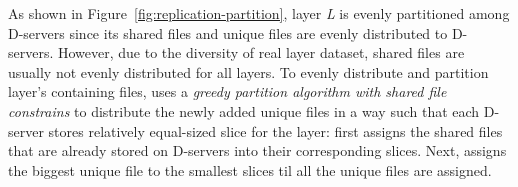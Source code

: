 As shown in Figure~\ref{fig:replication-partition},
layer \emph{L} is evenly partitioned among D-servers 
since its shared files and unique files are evenly distributed to D-servers. 
However,
due to the diversity of real layer dataset,
shared files are usually not evenly distributed for all layers. 
To evenly distribute and partition layer's containing files,
%
\sysname uses a \emph{greedy partition algorithm with shared file constrains} to 
distribute the newly added unique files in a way such that
each D-server stores relatively equal-sized slice for the layer:
\sysname first assigns the shared files that are already stored on D-servers into 
their corresponding slices. 
Next,
\sysname
assigns the biggest unique file to the smallest slices
til all the unique files are assigned.




